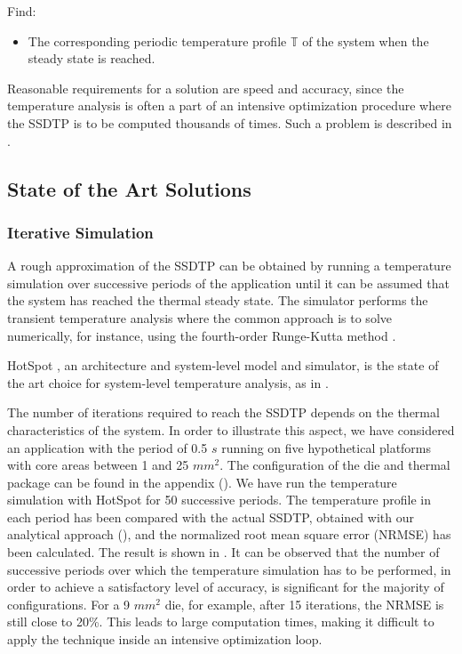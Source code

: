 Find:
\begin{itemize}

\item The corresponding periodic temperature profile $\mathbb{T}$ of the system
when the steady state is reached.

\end{itemize}
Reasonable requirements for a solution are speed and accuracy, since the
temperature analysis is often a part of an intensive optimization procedure
where the SSDTP is to be computed thousands of times. Such a problem is
described in .

\subsection{State of the Art Solutions} 

\subsubsection{Iterative Simulation} 

A rough approximation of the SSDTP can be obtained by running a temperature
simulation over successive periods of the application until it can be assumed
that the system has reached the thermal steady state. The simulator performs the
transient temperature analysis where the common approach is to solve
 numerically, for instance, using the fourth-order
Runge-Kutta method \cite{press2007}.

HotSpot \cite{skadron2003}, an architecture and system-level model and
simulator, is the state of the art choice for system-level temperature analysis,
as in \cite{srinivasan2004, liao2005, coskun2006, liu2007, huang2009, xiang2010,
thiele2011}.

The number of iterations required to reach the SSDTP depends on the thermal
characteristics of the system. In order to illustrate this aspect, we have
considered an application with the period of 0.5 $s$ running on five
hypothetical platforms with core areas between 1 and 25 $mm^2$. The
configuration of the die and thermal package can be found in the appendix
(). We have run the temperature simulation with HotSpot
\cite{skadron2003} for 50 successive periods. The temperature profile in each
period has been compared with the actual SSDTP, obtained with our analytical
approach (), and the normalized root mean square error
(NRMSE) has been calculated. The result is shown in . It can
be observed that the number of successive periods over which the temperature
simulation has to be performed, in order to achieve a satisfactory level of
accuracy, is significant for the majority of configurations. For a 9 $mm^2$ die,
for example, after 15 iterations, the NRMSE is still close to 20\%. This leads
to large computation times, making it difficult to apply the technique inside an
intensive optimization loop.

